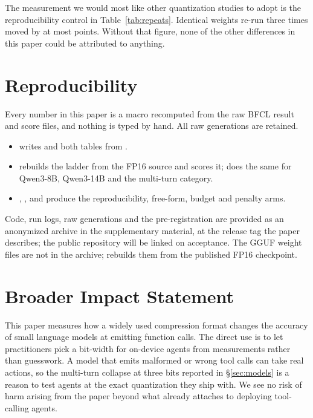 \documentclass[10pt]{article}
\newcommand{\bfcl}{BFCL}
\begin{document}
The measurement we would most like other quantization studies to adopt is the reproducibility control in Table~\ref{tab:repeats}. Identical weights re-run three times moved by at most \qtMaxRepRange{} points. Without that figure, none of the other differences in this paper could be attributed to anything.

\section*{Reproducibility}
Every number in this paper is a macro recomputed from the raw \bfcl{} result and score files, and nothing is typed by hand. All raw generations are retained.
\begin{itemize}\setlength{\itemsep}{0pt}
\item {} writes  and both tables from .
\item {} rebuilds the ladder from the FP16 source and scores it;  does the same for Qwen3-8B, Qwen3-14B and the multi-turn category.
\item {}, ,  and  produce the reproducibility, free-form, budget and penalty arms.
\end{itemize}
Code, run logs, raw generations and the pre-registration are provided as an anonymized archive in the supplementary material, at the release tag the paper describes; the public repository will be linked on acceptance. The GGUF weight files are not in the archive;  rebuilds them from the published FP16 checkpoint.

\section*{Broader Impact Statement}
This paper measures how a widely used compression format changes the accuracy of small language models at emitting function calls. The direct use is to let practitioners pick a bit-width for on-device agents from measurements rather than guesswork. A model that emits malformed or wrong tool calls can take real actions, so the multi-turn collapse at three bits reported in \S\ref{sec:models} is a reason to test agents at the exact quantization they ship with. We see no risk of harm arising from the paper beyond what already attaches to deploying tool-calling agents.



\end{document}
